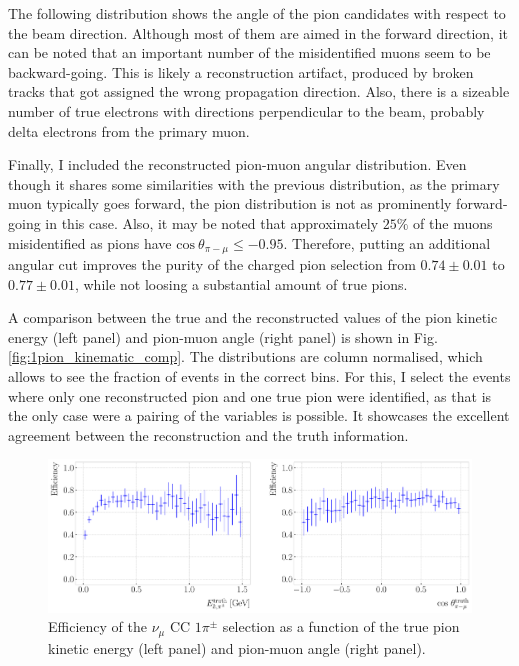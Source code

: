 The following distribution shows the angle of the pion candidates with respect to the beam direction. Although most of them are aimed in the forward direction, it can be noted that an important number of the misidentified muons seem to be backward-going. This is likely a reconstruction artifact, produced by broken tracks that got assigned the wrong propagation direction. Also, there is a sizeable number of true electrons with directions perpendicular to the beam, probably delta electrons from the primary muon.

Finally, I included the reconstructed pion-muon angular distribution. Even though it shares some similarities with the previous distribution, as the primary muon typically goes forward, the pion distribution is not as prominently forward-going in this case. Also, it may be noted that approximately $25\%$ of the muons misidentified as pions have $\mathrm{cos}~\theta_{\pi - \mu} \leq -0.95$. Therefore, putting an additional angular cut improves the purity of the charged pion selection from $0.74 \pm 0.01$ to $0.77 \pm 0.01$, while not loosing a substantial amount of true pions.

A comparison between the true and the reconstructed values of the pion kinetic energy (left panel) and pion-muon angle (right panel) is shown in Fig. \ref{fig:1pion_kinematic_comp}. The distributions are column normalised, which allows to see the fraction of events in the correct bins. For this, I select the events where only one reconstructed pion and one true pion were identified, as that is the only case were a pairing of the variables is possible. It showcases the excellent agreement between the reconstruction and the truth information.

\begin{figure}[t]
    \centering
    \includegraphics[width=.99\linewidth]{Images/GAr_selection/pion_selection_1pion_kin_efficiency.pdf}
    \caption[Efficiency of the $\nu_{\mu}$ CC $1\pi^{\pm}$ selection as a function of the true pion kinetic energy and pion-muon angle.]{Efficiency of the $\nu_{\mu}$ CC $1\pi^{\pm}$ selection as a function of the true pion kinetic energy (left panel) and pion-muon angle (right panel).}
    \label{fig:1pion_kin_efficiency}
\end{figure}

